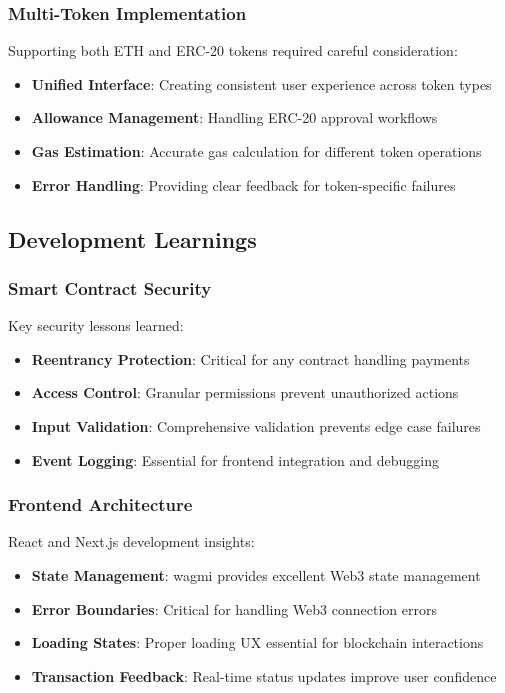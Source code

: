 \documentclass[12pt,a4paper]{article}
\begin{document}
\subsubsection{Multi-Token Implementation}
Supporting both ETH and ERC-20 tokens required careful consideration:
\begin{itemize}
    \item \textbf{Unified Interface}: Creating consistent user experience across token types
    \item \textbf{Allowance Management}: Handling ERC-20 approval workflows
    \item \textbf{Gas Estimation}: Accurate gas calculation for different token operations
    \item \textbf{Error Handling}: Providing clear feedback for token-specific failures
\end{itemize}

\subsection{Development Learnings}

\subsubsection{Smart Contract Security}
Key security lessons learned:
\begin{itemize}
    \item \textbf{Reentrancy Protection}: Critical for any contract handling payments
    \item \textbf{Access Control}: Granular permissions prevent unauthorized actions
    \item \textbf{Input Validation}: Comprehensive validation prevents edge case failures
    \item \textbf{Event Logging}: Essential for frontend integration and debugging
\end{itemize}

\subsubsection{Frontend Architecture}
React and Next.js development insights:
\begin{itemize}
    \item \textbf{State Management}: wagmi provides excellent Web3 state management
    \item \textbf{Error Boundaries}: Critical for handling Web3 connection errors
    \item \textbf{Loading States}: Proper loading UX essential for blockchain interactions
    \item \textbf{Transaction Feedback}: Real-time status updates improve user confidence
\end{itemize}
\end{document}
